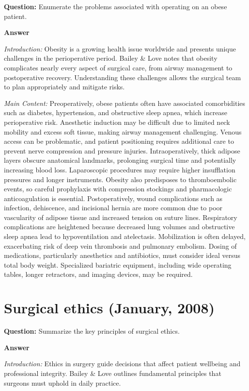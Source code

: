 \documentclass{article}
\begin{document}
\textbf{Question:} Enumerate the problems associated with operating on an obese patient.

\textbf{Answer}

\emph{Introduction:} Obesity is a growing health issue worldwide and presents unique challenges in the perioperative period. Bailey \& Love notes that obesity complicates nearly every aspect of surgical care, from airway management to postoperative recovery. Understanding these challenges allows the surgical team to plan appropriately and mitigate risks.

\emph{Main Content:} Preoperatively, obese patients often have associated comorbidities such as diabetes, hypertension, and obstructive sleep apnea, which increase perioperative risk. Anesthetic induction may be difficult due to limited neck mobility and excess soft tissue, making airway management challenging. Venous access can be problematic, and patient positioning requires additional care to prevent nerve compression and pressure injuries. Intraoperatively, thick adipose layers obscure anatomical landmarks, prolonging surgical time and potentially increasing blood loss. Laparoscopic procedures may require higher insufflation pressures and longer instruments. Obesity also predisposes to thromboembolic events, so careful prophylaxis with compression stockings and pharmacologic anticoagulation is essential. Postoperatively, wound complications such as infection, dehiscence, and incisional hernia are more common due to poor vascularity of adipose tissue and increased tension on suture lines. Respiratory complications are heightened because decreased lung volumes and obstructive sleep apnea lead to hypoventilation and atelectasis. Mobilization is often delayed, exacerbating risk of deep vein thrombosis and pulmonary embolism. Dosing of medications, particularly anesthetics and antibiotics, must consider ideal versus total body weight. Specialized bariatric equipment, including wide operating tables, longer retractors, and imaging devices, may be required.
\section{Surgical ethics (January, 2008)}


\textbf{Question:} Summarize the key principles of surgical ethics.

\textbf{Answer}

\emph{Introduction:} Ethics in surgery guide decisions that affect patient wellbeing and professional integrity. Bailey \& Love outlines fundamental principles that surgeons must uphold in daily practice.
\end{document}
